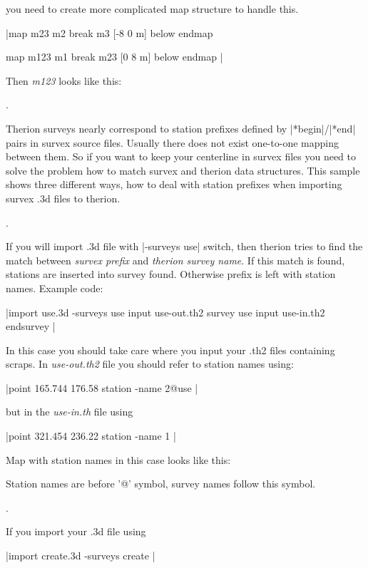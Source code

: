  you need to create more complicated map structure
 to handle this.


|map m23
  m2
  break
  m3 [-8 0 m] below
endmap

map m123
  m1
  break
  m23 [0 8 m] below
endmap
|


 Then {\it m123} looks like this:






.


 Therion surveys nearly correspond to station prefixes defined by
 |*begin|/|*end| pairs in survex source files. Usually there
 does not exist one-to-one mapping between them. So if you want
 to keep your centerline in survex files you need to solve the
 problem how to match survex and therion data structures. This
 sample shows three different ways, how to deal with station prefixes
 when importing survex .3d files to therion.


.


 If you will import .3d file with |-surveys use| switch,
 then therion tries to find the match between {\it survex prefix} 
 and {\it therion survey name}. If this match is found, stations
 are inserted into survey found. Otherwise prefix is left with 
 station names. Example code:


|import use.3d -surveys use
input use-out.th2
survey use
  input use-in.th2
endsurvey
|


 In this case you should take care where you input your .th2 files
 containing scraps. In {\it use-out.th2} file you should refer to station names
 using:


|point 165.744 176.58 station -name 2@use
|


 but in the {\it use-in.th} file using


|point 321.454 236.22 station -name 1
|


 Map with station names in this case looks like this:







 Station names are before '@' symbol, survey names follow this symbol.


.


 If you import your .3d file using


|import create.3d -surveys create
|


